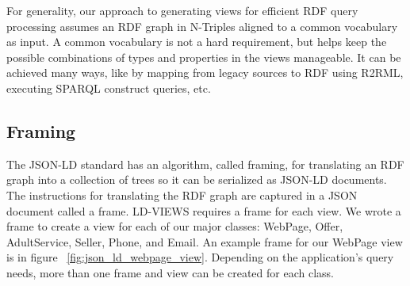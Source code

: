 For generality, our approach to generating views for efficient RDF query processing assumes an RDF graph in N-Triples aligned to a common vocabulary as input.  
A common vocabulary is not a hard requirement, but helps keep the possible combinations of types and properties in the views manageable.
It can be achieved many ways, like by mapping from legacy sources to RDF using R2RML, executing SPARQL construct queries, etc. 

\subsection{Framing}
The JSON-LD standard has an algorithm, called framing, for translating an RDF graph into a collection of trees so it can be serialized as JSON-LD documents.
The instructions for translating the RDF graph are captured in a JSON document called a frame.  
LD-VIEWS requires a frame for each view.  
We wrote a frame to create a view for each of our major classes: WebPage, Offer, AdultService, Seller, Phone, and Email.  
An example frame for our WebPage view is in figure ~\ref{fig:json_ld_webpage_view}.  
Depending on the application's query needs, more than one frame and view can be created for each class.  

